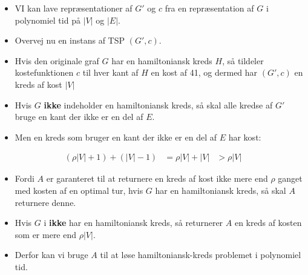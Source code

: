 \begin{frame}[allowframebreaks]
\begin{itemize}
		\item VI kan lave repræsentationer af $G'$ og $c$ fra en repræsentation af $G$ i polynomiel tid på $|V|$ og $|E|$.
		\item Overvej nu en instans af TSP $(G', c)$.
		\item Hvis den originale graf $G$ har en hamiltoniansk kreds $H$, så tildeler kostefunktionen $c$ til hver kant af $H$ en kost af 41, og dermed har $(G', c)$ en kreds af kost $|V|$
		\item Hvis $G$ \textbf{ikke} indeholder en hamiltoniansk kreds, så skal alle kredse af $G'$ bruge en kant der ikke er en del af $E$.
		\item Men en kreds som bruger en kant der ikke er en del af $E$ har kost:
	\end{itemize}
	\begin{align}
		(\rho|V| +1) + (|V|-1) & = \rho|V|+|V|
		                       & > \rho|V|
	\end{align}
	\begin{itemize}
		\item Fordi $A$ er garanteret til at returnere en kreds af kost ikke mere end $\rho$ ganget med kosten af en optimal tur, hvis $G$ har en hamiltoniansk kreds, så skal $A$ returnere denne.
		\item Hvis $G$ i \textbf{ikke} har en hamiltoniansk kreds, så returnerer $A$ en kreds af kosten som er mere end \(\rho|V|\).
		\item Derfor kan vi bruge $A$ til at løse hamiltoniansk-kreds problemet i polynomiel tid.
	\end{itemize}
\end{frame}

